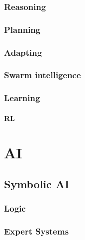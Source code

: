 \documentclass[12pt,a4paper,openright,twoside]{book}
\begin{document}
\subsection{Reasoning}\label{subsec:reasoning}

\subsection{Planning}\label{subsec:planning}

\subsection{Adapting}\label{subsec:adapting}

\subsection{Swarm intelligence}\label{subsec:swarm-intelligence}

\subsection{Learning}\label{subsec:learning}

\subsubsection{\Acl{RL}}\label{subsubsec:rl}


\chapter{\Acl{AI}}\label{ch:ai}

\section{Symbolic \ac{AI}}\label{sec:symbolic-ai}

\subsection{Logic}\label{subsec:logic}

\subsection{Expert Systems}\label{subsec:expert-systems}
\end{document}
